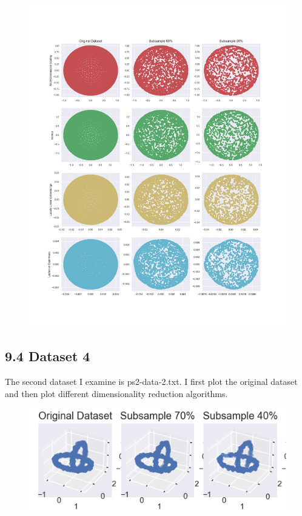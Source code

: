 \documentclass{article}
\begin{document}
            \begin{figure}[h]
                \label{fig:ps3_clustering}
                \includegraphics[width=1.2\linewidth]{images/ps2-dataset1.png}
            \end{figure}
            \clearpage

        \subsection*{9.4 Dataset 4}
            The second dataset I examine is ps2-data-2.txt. I first plot the original dataset and then plot different dimensionality reduction algorithms.

            \begin{figure}[h]
                \label{fig:ps4_clustering_original}
                \includegraphics[]{images/ps2-dataset2-original.png}
            \end{figure}
\end{document}
